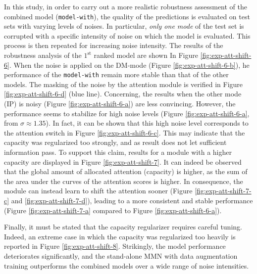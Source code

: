 In this study, in order to carry out a more realistic robustness assessment of the combined model (\texttt{model-with}), the quality of the predictions is evaluated on test sets with varying levels of noises. In particular, \textit{only one mode} of the test set is corrupted with a specific intensity of noise on which the model is evaluated. This process is then repeated for increasing noise intensity. The results of the robustness analysis of the $1^\text{st}$ ranked model are shown In Figure \ref{fig:exp-att-shift-6}. When the noise is applied on the DM-mode (Figure \ref{fig:exp-att-shift-6-b}), he performance of the \texttt{model-with} remain more stable than that of the other models. The masking of the noise by the attention module is verified in Figure \ref{fig:exp-att-shift-6-d} (blue line). Concerning, the results when the other mode (IP) is noisy (Figure \ref{fig:exp-att-shift-6-a}) are less convincing. However, the performance seems to stabilize for high noise levels (Figure \ref{fig:exp-att-shift-6-a}, from $\sigma \approx 1.35$). In fact, it can be shown that this high noise level corresponds to the attention switch in Figure \ref{fig:exp-att-shift-6-c}. This may indicate that the capacity was regularized too strongly, and as result does not let sufficient information pass. To support this claim, results for a module with a higher capacity are displayed in Figure \ref{fig:exp-att-shift-7}. It can indeed be observed that the global amount of allocated attention (capacity) is higher, as the sum of the area under the curves of the attention scores is higher. In consequence, the module can instead learn to shift the attention sooner (Figure \ref{fig:exp-att-shift-7-c} and \ref{fig:exp-att-shift-7-d}), leading to a more consistent and stable performance (Figure \ref{fig:exp-att-shift-7-a} compared to Figure \ref{fig:exp-att-shift-6-a}). 

Finally, it must be stated that the capacity regularizer requires careful tuning. Indeed, an extreme case in which the capacity was regularized too heavily is reported in Figure \ref{fig:exp-att-shift-8}. Strikingly, the model performance deteriorates significantly, and the stand-alone MMN with data augmentation training outperforms the combined models over a wide range of noise intensities. 


